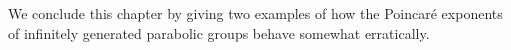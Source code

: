We conclude this chapter by giving two examples of how the Poincar\'e exponents of infinitely generated parabolic groups behave somewhat erratically.%

%
%
